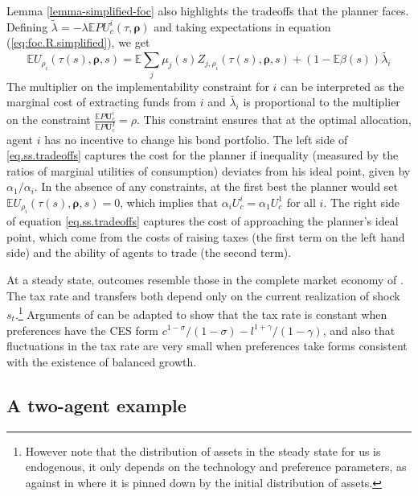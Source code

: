 \documentclass[thmsb,11pt]{article}
\begin{document}
\color{black}

Lemma \ref{lemma-simplified-foc} also highlights the tradeoffs that the planner faces.  Defining $\tilde{\lambda}=-\lambda \mathbb{E}P U^i_c(\tau,\bm \rho)$ and taking expectations in equation (\ref{eq:foc.R.simplified}), we get
\begin{equation}
\label{eq.ss.tradeoffs}
\mathbb{E} U_{\rho_i}(\tau(s),\bm \rho,s)= \mathbb{E} \sum_j\mu_j(s)Z_{j,\rho_i}(\tau(s),\bm \rho,s) + (1-\mathbb{E}\beta(s))\tilde{\lambda_i}
\end{equation}
The multiplier on the implementability constraint for $i$ can be interpreted as the marginal cost of extracting funds from $i$  and $\tilde{\lambda_i}$ is proportional to the multiplier on the constraint $\frac{\mathbb{E}P\bm{U}^i_c}{\mathbb{E}P \bm{U}^{I}_c}=\rho$. This constraint ensures that at the optimal allocation, agent $i$ has no  incentive to change his bond portfolio. The left side of \eqref{eq.ss.tradeoffs} captures the cost for the planner if inequality (measured by the ratios of marginal utilities of consumption) deviates from his ideal point, given by $\alpha_1/\alpha_i$. In the absence of any constraints, at the first best the planner would set $\mathbb{E} U_{\rho_i}(\tau(s),\bm \rho,s)=0$, which implies that $\alpha_i U^i_c = \alpha_1 U^1_c$ for all $i$. The right  side of equation \eqref{eq.ss.tradeoffs} captures the cost of approaching the planner's ideal point, which come from the costs of raising taxes (the first term on the left hand side) and the ability of
agents to trade (the second term).

At a steady state, outcomes resemble those in  the complete market economy of \citet{Wer07a}.
The tax rate  and transfers both depend only on the current realization of shock $s_t$.\footnote{However note that the distribution of assets in the steady state for us is endogenous, it only depends on the technology and preference parameters, as against in \citet{Wer07a} where it is pinned down by the initial distribution of assets.}
Arguments of \citeauthor{Wer07a} can be adapted  to show that the tax rate is
constant when preferences have the CES form $c^{1-\sigma}/(1-\sigma) - l^{1+\gamma}/(1-\gamma) $,  and also that fluctuations in the tax rate
are very small when preferences take forms consistent with the existence of  balanced growth.


\subsection{A two-agent example}\label{sec: 2 agent example}
\end{document}
